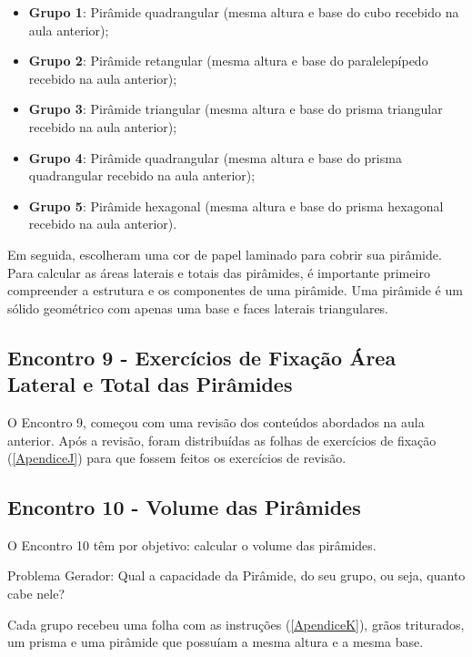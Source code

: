 \begin{itemize}
    \item \textbf{Grupo 1}: Pirâmide quadrangular (mesma altura e base do cubo recebido na aula anterior);
    \item \textbf{Grupo 2}: Pirâmide retangular (mesma altura e base do paralelepípedo recebido na aula anterior);
    \item \textbf{Grupo 3}: Pirâmide triangular (mesma altura e base do prisma triangular recebido na aula anterior);
    \item \textbf{Grupo 4}: Pirâmide quadrangular (mesma altura e base do prisma quadrangular recebido na aula anterior);
    \item \textbf{Grupo 5}: Pirâmide hexagonal (mesma altura e base do prisma hexagonal recebido na aula anterior).
\end{itemize}

Em seguida, escolheram uma cor de papel laminado para cobrir sua pirâmide. Para calcular as áreas laterais e totais das pirâmides, é importante primeiro compreender a estrutura e os componentes de uma pirâmide. Uma pirâmide é um sólido geométrico com apenas uma base e faces laterais triangulares.

\subsection{Encontro 9 - Exercícios de Fixação Área Lateral e Total das Pirâmides}

O Encontro 9, começou com uma revisão dos conteúdos abordados na aula anterior. Após a revisão, foram distribuídas as folhas de exercícios de fixação (\autoref{ApendiceJ}) para que fossem feitos os exercícios de revisão.

\subsection{Encontro 10 - Volume das Pirâmides}

O Encontro 10 têm por objetivo: calcular o volume das pirâmides.

Problema Gerador: Qual a capacidade da Pirâmide, do seu grupo, ou seja, quanto cabe nele?

Cada grupo recebeu uma folha com as instruções (\autoref{ApendiceK}), grãos triturados, um prisma e uma pirâmide que possuíam a mesma altura e a mesma base.

